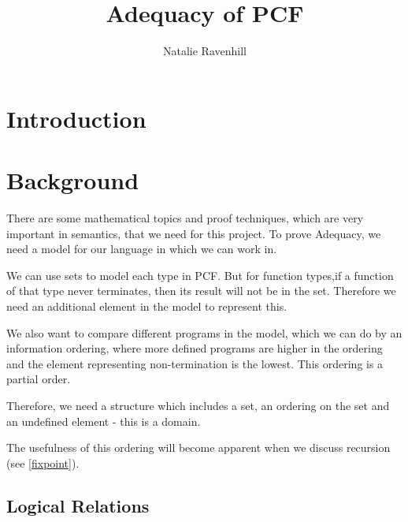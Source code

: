 \documentclass{report}
\title{Adequacy of PCF}
\author{Natalie Ravenhill}
\begin{document}
\maketitle
\newcommand{\natb}{\mathbb{N}_{\bot}}
\tableofcontents
\chapter{Introduction}

\chapter{Background}
There are some mathematical topics and proof techniques, which are very important in semantics, that we need for this project. To prove Adequacy, we need a model for our language in which we can work in.

We can use sets to model each type in PCF. But for function types,if a function of that type never terminates, then its result will not be in the set. Therefore we need an additional element in the model to represent this.

We also want to compare different programs in the model, which we can do by an information ordering, where more defined programs are higher in the ordering and the element representing non-termination is the lowest. This ordering is a partial order.


Therefore, we need a structure which includes a set, an ordering on the set and an undefined element - this is a domain.

The usefulness of this ordering will become apparent when we discuss recursion (see \ref{fixpoint}).




\section{Logical Relations}


\end{document}

